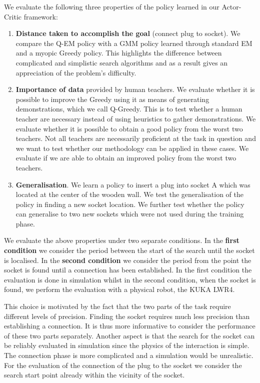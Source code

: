 We evaluate the following three properties of the policy learned in our Actor-Critic framework:
\begin{enumerate}
 \item \textbf{Distance taken to accomplish the goal} (connect plug to socket). We compare the Q-EM policy with 
 a GMM policy learned through standard EM and a myopic Greedy policy. This highlights the difference between complicated and simplistic  
  search algorithms and as a result gives an appreciation of the problem's difficulty.
 \item \textbf{Importance of data} provided by human teachers. We evaluate whether it is possible to improve 
 the Greedy using it as means of generating demonstrations, which we call Q-Greedy. This is to test whether a human teacher are necessary
 instead of using heuristics to gather demonstrations.
 We evaluate whether it is possible to obtain a good policy from the worst two teachers. Not all teachers 
 are necessarily proficient at the task in question and we want to test whether our methodology can be applied in these
 cases. We evaluate if we  are able to obtain an improved policy from the worst two teachers.
 \item \textbf{Generalisation}. We learn a policy to insert a plug into socket A which was located at the center of the wooden 
 wall. We test the generalisation of the policy in finding a new socket location. We further test whether the policy can generalise to two new sockets 
 which were not used during the training phase.
\end{enumerate}

We evaluate the above properties under two separate conditions. In the \textbf{first condition} we consider the period between the start 
of the search until the socket is localised. In the \textbf{second condition} we consider the period from the point the socket is found until
a connection has been established. In the first condition the evaluation is done in simulation whilst 
in the second condition, when the socket is found, we perform the evaluation with a physical robot, the KUKA LWR4.

This choice is motivated by the fact that the two parts of the task require different levels of precision.
Finding the socket requires much less precision than establishing a connection. It is thus
more informative to consider the performance of these two parts separately.
Another aspect is that the search for the socket can be reliably evaluated in simulation since the physics of the interaction
is simple. The connection phase is more complicated and a simulation would be unrealistic.
For the evaluation of the connection of the plug to the socket we consider the search start point already within 
the vicinity of the socket.

